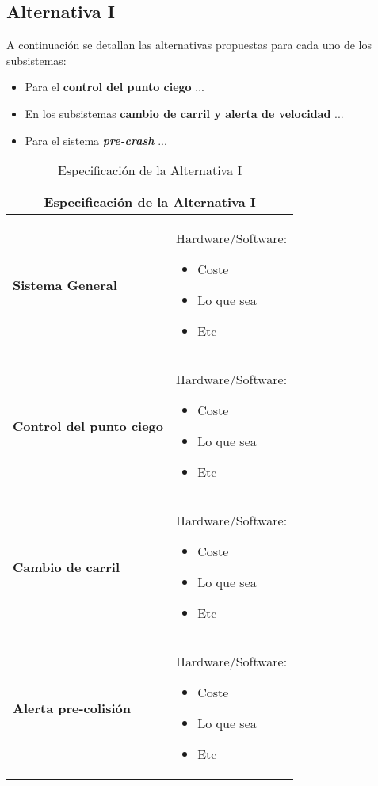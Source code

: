 \subsection{Alternativa I}

\par A continuación se detallan las alternativas propuestas para cada uno de los subsistemas:

\begin{itemize}[-]
    \item Para el \textbf{control del punto ciego} ...
    \item En los subsistemas \textbf{cambio de carril y alerta de velocidad} ...
    \item Para el sistema \textbf{\textit{pre-crash}} ...
\end{itemize}


\begin{table}[H]
\begin{center}
\begin{tabular}{p{5cm} p{8cm}}
\multicolumn{2}{c}{\textbf{Especificación de la Alternativa I} } \\
\hline \hline

\textbf{Sistema General} &
Hardware/Software:
\begin{itemize}
    \item Coste
    \item Lo que sea
    \item Etc
\end{itemize}
\\ \hline

\textbf{Control del punto ciego} &
Hardware/Software:
\begin{itemize}
    \item Coste
    \item Lo que sea
    \item Etc
\end{itemize}
\\ \hline

\textbf{Cambio de carril} &
Hardware/Software:
\begin{itemize}
    \item Coste
    \item Lo que sea
    \item Etc
\end{itemize}
\\ \hline

\textbf{Alerta pre-colisión} &
Hardware/Software:
\begin{itemize}
    \item Coste
    \item Lo que sea
    \item Etc
\end{itemize}
\\ \hline

\end{tabular}
\caption{Especificación de la Alternativa I}
\label{tab:altI}
\end{center}
\end{table}
